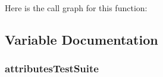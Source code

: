 Here is the call graph for this function\+:




\subsection{Variable Documentation}
\subsubsection[{\texorpdfstring{attributes\+Test\+Suite}{attributesTestSuite}}]{ attributes\+Test\+Suite\hspace{0.3cm}{\ttfamily [static]}}\hypertarget{attribute-test-suite_8cc_ae19fbe9589d85c1741f99fe8c8b7e8af}{}\label{attribute-test-suite_8cc_ae19fbe9589d85c1741f99fe8c8b7e8af}

